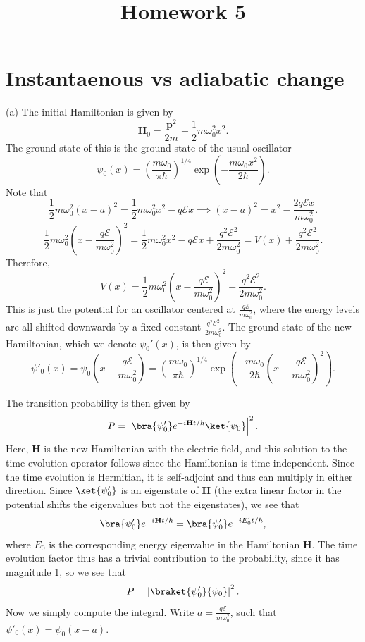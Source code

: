 \documentclass[11pt, letterpaper]{article}
\title{Homework 5}
\begin{document}
\makeproblem

\section{Instantaenous vs adiabatic change}

(a) The initial Hamiltonian is given by
\[
	\mathbf{H}_0 =\frac{\mathbf{p} ^2}{2m} +\frac{1}{2} m\omega _0^2x^2
.\]
The ground state of this is the ground state of the usual oscillator
\[
	\psi _0(x)=\left( \frac{m\omega _0}{\pi \hbar}  \right) ^{1/4} \exp \left( -\frac{m\omega _0x^2}{2\hbar}  \right) 
.\]
Note that
\[
	\frac{1}{2} m\omega _0^2\left( x-a \right) ^2=\frac{1}{2} m\omega _0^2x^2-q\mathcal{E} x\implies \left( x-a \right) ^2=x^2-\frac{2q\mathcal{E} x}{m\omega _0^2} 
.\]
\[
	\frac{1}{2} m\omega _0^2\left( x-\frac{q\mathcal{E} }{m\omega _0^2}  \right) ^2=\frac{1}{2} m\omega _0^2x^2-q\mathcal{E} x+\frac{q^2\mathcal{E} ^2}{2m\omega _0^2} =V(x)+\frac{q^2\mathcal{E} ^2}{2m\omega _0^2} 
.\]
Therefore,
\[
	V(x)=\frac{1}{2} m\omega _0^2\left( x-\frac{q\mathcal{E} }{m\omega _0^2}  \right) ^2-\frac{q^2\mathcal{E} ^2}{2m\omega _0^2} 
.\]
This is just the potential for an oscillator centered at $\frac{q\mathcal{E} }{m\omega _0^2} $, where the energy levels are all shifted downwards by a fixed constant $\frac{q^2\mathcal{E} ^2}{2m\omega _0^2} $.
The ground state of the new Hamiltonian, which we denote $\psi_0'(x)$, is then given by
\[
	\psi '_0(x)=\psi _0\left( x-\frac{q\mathcal{E} }{m\omega _0^2}  \right) =\left( \frac{m\omega _0}{\pi \hbar}  \right) ^{1/4} \exp \left( -\frac{m\omega _0}{2\hbar} \left( x-\frac{q\mathcal{E} }{m\omega _0^2}  \right) ^2 \right) 
.\]

The transition probability is then given by
\[
	P=\left|\bra{\psi'_0}e^{-i\mathbf{H}t/\hbar} \ket{\psi_0}\right|^2
.\]
Here, $\mathbf{H} $ is the new Hamiltonian with the electric field, and this solution to the time evolution operator follows since the Hamiltonian is time-independent. Since the time evolution is Hermitian, it is self-adjoint and thus can multiply in either direction. Since $\ket{\psi _0'}$ is an eigenstate of $\mathbf{H} $ (the extra linear factor in the potential shifts the eigenvalues but not the eigenstates), we see that
\[
	\bra{\psi _0'}e^{-i \mathbf{H} t/\hbar}=\bra{\psi _0'}e^{-iE'_0t/\hbar} ,
\]
where $E_0$ is the corresponding energy eigenvalue in the Hamiltonian $\mathbf{H} $. The time evolution factor thus has a trivial contribution to the probability, since it has magnitude 1, so we see that
\[
	P=\left| \braket{\psi _0'}{\psi _0} \right| ^2
.\]
Now we simply compute the integral. Write $a=\frac{q\mathcal{E} }{m\omega _0^2} $, such that $\psi '_0(x)=\psi _0(x-a)$.
\end{document}
